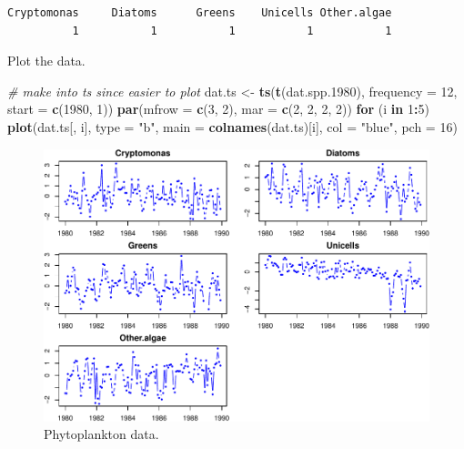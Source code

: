 \documentclass[
]{article}
\newenvironment{Shaded}{\begin{snugshade}}{\end{snugshade}}
\newcommand{\CommentTok}[1]{\textcolor[rgb]{0.56,0.35,0.01}{\textit{#1}}}
\newcommand{\ControlFlowTok}[1]{\textcolor[rgb]{0.13,0.29,0.53}{\textbf{#1}}}
\newcommand{\DataTypeTok}[1]{\textcolor[rgb]{0.13,0.29,0.53}{#1}}
\newcommand{\DecValTok}[1]{\textcolor[rgb]{0.00,0.00,0.81}{#1}}
\newcommand{\FloatTok}[1]{\textcolor[rgb]{0.00,0.00,0.81}{#1}}
\newcommand{\KeywordTok}[1]{\textcolor[rgb]{0.13,0.29,0.53}{\textbf{#1}}}
\newcommand{\NormalTok}[1]{#1}
\newcommand{\OperatorTok}[1]{\textcolor[rgb]{0.81,0.36,0.00}{\textbf{#1}}}
\newcommand{\StringTok}[1]{\textcolor[rgb]{0.31,0.60,0.02}{#1}}
\begin{document}
\begin{verbatim}
Cryptomonas     Diatoms      Greens    Unicells Other.algae 
          1           1           1           1           1 
\end{verbatim}

Plot the data.

\begin{Shaded}
\begin{Highlighting}[]
\CommentTok{# make into ts since easier to plot}
\NormalTok{dat.ts <-}\StringTok{ }\KeywordTok{ts}\NormalTok{(}\KeywordTok{t}\NormalTok{(dat.spp}\FloatTok{.1980}\NormalTok{), }\DataTypeTok{frequency =} \DecValTok{12}\NormalTok{, }\DataTypeTok{start =} \KeywordTok{c}\NormalTok{(}\DecValTok{1980}\NormalTok{, }
    \DecValTok{1}\NormalTok{))}
\KeywordTok{par}\NormalTok{(}\DataTypeTok{mfrow =} \KeywordTok{c}\NormalTok{(}\DecValTok{3}\NormalTok{, }\DecValTok{2}\NormalTok{), }\DataTypeTok{mar =} \KeywordTok{c}\NormalTok{(}\DecValTok{2}\NormalTok{, }\DecValTok{2}\NormalTok{, }\DecValTok{2}\NormalTok{, }\DecValTok{2}\NormalTok{))}
\ControlFlowTok{for}\NormalTok{ (i }\ControlFlowTok{in} \DecValTok{1}\OperatorTok{:}\DecValTok{5}\NormalTok{) }\KeywordTok{plot}\NormalTok{(dat.ts[, i], }\DataTypeTok{type =} \StringTok{"b"}\NormalTok{, }\DataTypeTok{main =} \KeywordTok{colnames}\NormalTok{(dat.ts)[i], }
    \DataTypeTok{col =} \StringTok{"blue"}\NormalTok{, }\DataTypeTok{pch =} \DecValTok{16}\NormalTok{)}
\end{Highlighting}
\end{Shaded}

\begin{figure}

{\centering \includegraphics[width=0.8\linewidth]{fitting-models-with-stan_files/figure-latex/stan-plot-dfa-1} 

}

\caption{Phytoplankton data.}\label{fig:stan-plot-dfa}
\end{figure}
\end{document}
